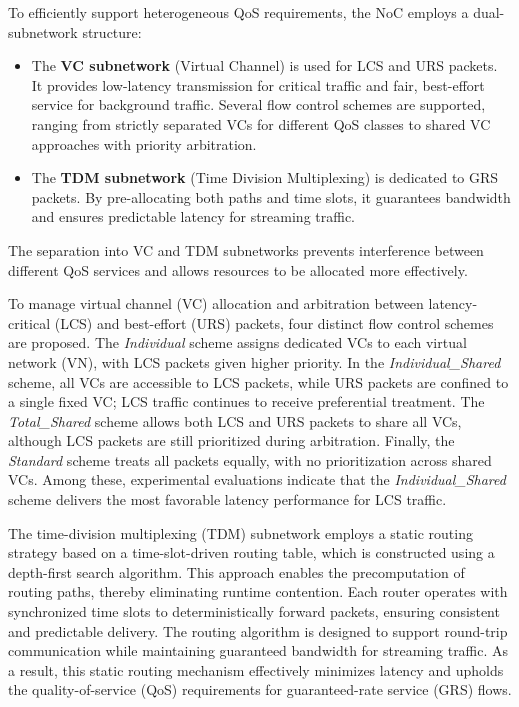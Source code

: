 To efficiently support heterogeneous QoS requirements, the NoC employs a dual-subnetwork structure:
\begin{itemize}
    \item The \textbf{VC subnetwork} (Virtual Channel) is used for LCS and URS packets. It provides low-latency transmission for critical traffic and fair, best-effort service for background traffic. Several flow control schemes are supported, ranging from strictly separated VCs for different QoS classes to shared VC approaches with priority arbitration.
    \item The \textbf{TDM subnetwork} (Time Division Multiplexing) is dedicated to GRS packets. By pre-allocating both paths and time slots, it guarantees bandwidth and ensures predictable latency for streaming traffic.
\end{itemize}
The separation into VC and TDM subnetworks prevents interference between different QoS services and allows resources to be allocated more effectively.


To manage virtual channel (VC) allocation and arbitration between latency-critical (LCS) and best-effort (URS) packets, four distinct flow control schemes are proposed. The \textit{Individual} scheme assigns dedicated VCs to each virtual network (VN), with LCS packets given higher priority. In the \textit{Individual\_Shared} scheme, all VCs are accessible to LCS packets, while URS packets are confined to a single fixed VC; LCS traffic continues to receive preferential treatment. The \textit{Total\_Shared} scheme allows both LCS and URS packets to share all VCs, although LCS packets are still prioritized during arbitration. Finally, the \textit{Standard} scheme treats all packets equally, with no prioritization across shared VCs. Among these, experimental evaluations indicate that the \textit{Individual\_Shared} scheme delivers the most favorable latency performance for LCS traffic.


The time-division multiplexing (TDM) subnetwork employs a static routing strategy based on a time-slot-driven routing table, which is constructed using a depth-first search algorithm. This approach enables the precomputation of routing paths, thereby eliminating runtime contention. Each router operates with synchronized time slots to deterministically forward packets, ensuring consistent and predictable delivery. The routing algorithm is designed to support round-trip communication while maintaining guaranteed bandwidth for streaming traffic. As a result, this static routing mechanism effectively minimizes latency and upholds the quality-of-service (QoS) requirements for guaranteed-rate service (GRS) flows.


